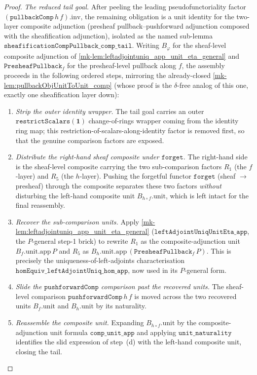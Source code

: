 \begin{proof}
  \emph{The reduced tail goal.} After peeling the leading pseudofunctoriality factor
  \((\mathtt{pullbackComp}\,h\,f).\mathrm{inv}\), the remaining obligation is a unit
  identity for the two-layer composite adjunction (presheaf pullback--pushforward adjunction
  composed with the sheafification adjunction), isolated as the named sub-lemma
  \(\mathtt{sheafificationCompPullback\_comp\_tail}\). Writing \(B_{\varphi}\) for the
  sheaf-level composite adjunction of \ref{mk-lem:leftadjointuniq_app_unit_eta_general} and
  \(\mathtt{PresheafPullback}_f\) for the presheaf-level pullback along \(f\), the assembly
  proceeds in the following ordered steps, mirroring the already-closed
  \ref{mk-lem:pullbackObjUnitToUnit_comp} (whose proof is the \(\delta\)-free analog of this one,
  exactly one sheafification layer down):
  \begin{enumerate}
    \item[(a)] \emph{Strip the outer identity wrapper.} The tail goal carries an outer
      \(\mathtt{restrictScalars}(\mathbf{1})\) change-of-rings wrapper coming from the
      identity ring map; this restriction-of-scalars-along-identity factor is removed first,
      so that the genuine comparison factors are exposed.
    \item[(b)] \emph{Distribute the right-hand sheaf composite under \(\mathtt{forget}\).} The
      right-hand side is the sheaf-level composite carrying the two sub-comparison factors
      \(R_1\) (the \(f\)-layer) and \(R_5\) (the \(h\)-layer). Pushing the forgetful functor
      \(\mathtt{forget}\) (sheaf \(\to\) presheaf) through the composite separates these two
      factors \emph{without} disturbing the left-hand composite unit \(B_{h\circ f}.\mathrm{unit}\),
      which is left intact for the final reassembly.
    \item[(c)] \emph{Recover the sub-comparison units.} Apply
      \ref{mk-lem:leftadjointuniq_app_unit_eta_general}
      (\(\mathtt{leftAdjointUniqUnitEta\_app}\), the \(P\)-general step-1 brick) to rewrite
      \(R_1\) as the composite-adjunction unit \(B_f.\mathrm{unit}.\mathrm{app}\,P\) and
      \(R_5\) as \(B_h.\mathrm{unit}.\mathrm{app}\,(\mathtt{PresheafPullback}_f\,P)\). This is
      precisely the uniqueness-of-left-adjoints characterisation
      \(\mathtt{homEquiv\_leftAdjointUniq\_hom\_app}\), now used in its \(P\)-general form.
    \item[(d)] \emph{Slide the \(\mathtt{pushforwardComp}\) comparison past the recovered
      units.} The sheaf-level comparison \(\mathtt{pushforwardComp}\,h\,f\) is moved across the
      two recovered units \(B_f.\mathrm{unit}\) and \(B_h.\mathrm{unit}\) by its naturality.
    \item[(e)] \emph{Reassemble the composite unit.} Expanding
      \(B_{h\circ f}.\mathrm{unit}\) by the composite-adjunction unit formula
      \(\mathtt{comp\_unit\_app}\) and applying \(\mathtt{unit\_naturality}\) identifies the
      slid expression of step~(d) with the left-hand composite unit, closing the tail.
  \end{enumerate}


\end{proof}
